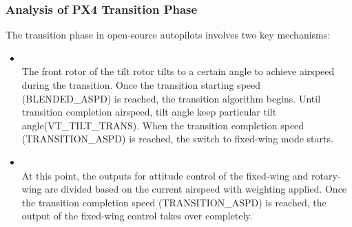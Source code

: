 \documentclass[journal,article,submit,pdftex,moreauthors]{Definitions/mdpi}
\begin{document}
\subsubsection{Analysis of PX4 Transition Phase}
The transition phase in open-source autopilots involves two key mechanisms:
\begin{itemize}
    \item {} \\
    The front rotor of the tilt rotor tilts to a certain angle to achieve airspeed during the transition. Once the transition starting speed (BLENDED\_ASPD) is reached, the transition algorithm begins. Until transition completion airspeed, tilt angle keep particular tilt angle(VT\_TILT\_TRANS). When the transition completion speed (TRANSITION\_ASPD) is reached, the switch to fixed-wing mode starts.
    \item {} \\
    At this point, the outputs for attitude control of the fixed-wing and rotary-wing are divided based on the current airspeed with weighting applied. Once the transition completion speed (TRANSITION\_ASPD) is reached, the output of the fixed-wing control takes over completely.
\end{itemize}
\end{document}

